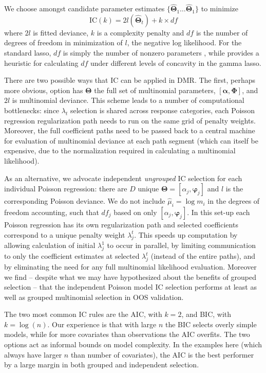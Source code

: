 \documentclass[12pt]{article}
\newcommand{\bs}[1]{\boldsymbol{#1}}
\begin{document}
We choose amongst  candidate
parameter estimates $\{\bs{\hat\Theta}_1 \ldots \bs{\hat\Theta}_1 \}$ to
minimize \begin{equation}\label{cp} \text{IC}(k) = 2l(\bs{\hat\Theta}_t ) +
k\times df \end{equation} where $2l$ is fitted deviance,   $k$ is a complexity
penalty and $df$ is the number of degrees of freedom in minimization of $l$,
the negative log likelihood.   For the standard lasso, $df$ is simply the
number of nonzero parameters \citep{zou_degrees_2007}, while
\cite{taddy_gamma_2013} provides a heuristic for calculating $df$ under
different levels of concavity in the gamma lasso.

There are two possible ways that IC can be applied in DMR.  The first, perhaps more obvious, option has $\bs{\Theta}$ the full set of multinomial parameters, $[\bs{\alpha},\bs{\Phi}]$, and $2l$ is multinomial deviance.  This scheme leads to a number of computational bottlenecks: since $\lambda_t$ selection is shared across response categories, each 
 Poisson regression regularization path needs to run on the same grid of penalty weights.  Moreover, the full coefficient paths need to be passed back to a central machine for evaluation of multinomial deviance at each path segment (which can itself be expensive, due to the normalization required in calculating a multinomial likelihood).  

As an alternative, we advocate independent {\it ungrouped} IC selection for each individual Poisson regression: there are $D$ unique $\bs{\Theta} = [\alpha_j,\bs{\varphi}_j]$ and $l$ is 
the corresponding Poisson deviance.  We do not include $\hat \mu_i = \log m_i$ in the degrees of freedom accounting, such that $df_j$ based on only $[\alpha_j,\bs{\varphi}_j]$.
In this set-up each Poisson regression has its own
regularization path and selected coefficients correspond to a unique penalty weight $\lambda^t_j$.  This speeds up computation by allowing calculation of initial $\lambda^1_j$ to occur in parallel, by limiting communication to only the coefficient estimates at selected $\lambda^t_j$ (instead of the entire paths), and by eliminating the need for any full multinomial likelihood evaluation.  Moreover we find -- despite what we may have hypothesized about the benefits of grouped selection -- that the independent Poisson model IC selection performs at least as well as grouped multinomial selection in OOS validation.  

The two most common IC rules are the AIC, with $k=2$, and BIC, with
$k=\log(n)$. Our experience is that with large $n$ the BIC selects overly
simple models, while for more covariates than observations the AIC overfits.
The two options act as informal bounds on model complexity.
In the examples here (which always have larger $n$ than number of
covariates), the AIC is the best performer by a large margin in both grouped and independent selection.  
\end{document}
